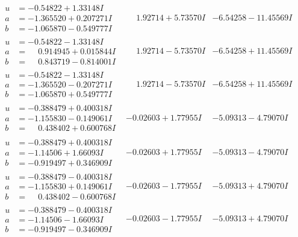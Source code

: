 \documentclass[1p]{elsarticle_modified}
\theoremstyle{definition}
\begin{document}
$$\begin{array}{c|c|c}
\begin{aligned}
u &= -0.54822 + 1.33148 I \\
a &= -1.365520 + 0.207271 I \\
b &= -1.065870 - 0.549777 I\end{aligned}
 & \phantom{-}1.92714 + 5.73570 I & -6.54258 - 11.45569 I \\ \hline\begin{aligned}
u &= -0.54822 - 1.33148 I \\
a &= \phantom{-}0.914945 + 0.015844 I \\
b &= \phantom{-}0.843719 - 0.814001 I\end{aligned}
 & \phantom{-}1.92714 - 5.73570 I & -6.54258 + 11.45569 I \\ \hline\begin{aligned}
u &= -0.54822 - 1.33148 I \\
a &= -1.365520 - 0.207271 I \\
b &= -1.065870 + 0.549777 I\end{aligned}
 & \phantom{-}1.92714 - 5.73570 I & -6.54258 + 11.45569 I \\ \hline\begin{aligned}
u &= -0.388479 + 0.400318 I \\
a &= -1.155830 - 0.149061 I \\
b &= \phantom{-}0.438402 + 0.600768 I\end{aligned}
 & -0.02603 + 1.77955 I & -5.09313 - 4.79070 I \\ \hline\begin{aligned}
u &= -0.388479 + 0.400318 I \\
a &= -1.14506 + 1.66093 I \\
b &= -0.919497 + 0.346909 I\end{aligned}
 & -0.02603 + 1.77955 I & -5.09313 - 4.79070 I \\ \hline\begin{aligned}
u &= -0.388479 - 0.400318 I \\
a &= -1.155830 + 0.149061 I \\
b &= \phantom{-}0.438402 - 0.600768 I\end{aligned}
 & -0.02603 - 1.77955 I & -5.09313 + 4.79070 I \\ \hline\begin{aligned}
u &= -0.388479 - 0.400318 I \\
a &= -1.14506 - 1.66093 I \\
b &= -0.919497 - 0.346909 I\end{aligned}
 & -0.02603 - 1.77955 I & -5.09313 + 4.79070 I \\ \hline\begin{aligned}

\end{aligned}
\end{array}$$
\end{document}
